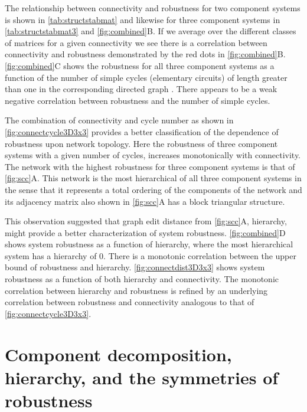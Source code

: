The relationship between connectivity and robustness for two component systems is shown in \ref{tab:structstabmat} and likewise for three component systems in \ref{tab:structstabmat3} and \ref{fig:combined}B. If we average over the different classes of matrices for a given connectivity we see there is a correlation between connectivity and robustness demonstrated by the red dots in \ref{fig:combined}B.
\ref{fig:combined}C shows the robustness for all three component systems as a function of the number of simple cycles (elementary circuits) of length greater than one in the corresponding directed graph \cite{Johnson1975}. There appears to be a weak negative correlation between robustness and the number of simple cycles.

The combination of connectivity and cycle number as shown in \ref{fig:connectcycle3D3x3} provides a better classification of the dependence of robustness upon network topology. Here the robustness of three component systems with a given number of cycles, increases monotonically with connectivity. The network with the highest robustness for three component systems is that of \ref{fig:scc}A. This network is the most hierarchical of all three component systems in the sense that it represents a total ordering of the components of the network and its adjacency matrix also shown in \ref{fig:scc}A has a block triangular structure.

This observation suggested that graph edit distance from \ref{fig:scc}A, hierarchy, might provide a better characterization of system robustness. \ref{fig:combined}D shows system robustness as a function of hierarchy, where the most hierarchical system has a hierarchy of 0. There is a monotonic correlation between the upper bound of robustness and hierarchy. \ref{fig:connectdist3D3x3} shows system robustness as a function of both hierarchy and connectivity. The monotonic correlation between hierarchy and robustness is refined by an underlying correlation between robustness and connectivity analogous to that of \ref{fig:connectcycle3D3x3}.

\section{Component decomposition, hierarchy, and the symmetries of robustness}

